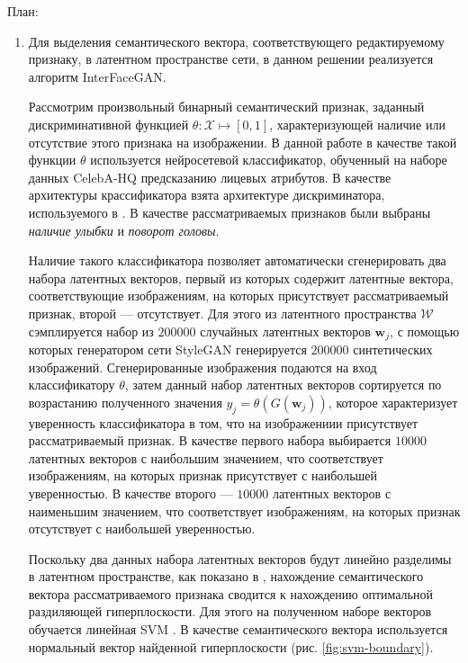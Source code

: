
План:
\begin{enumerate}

\item 
Для выделения семантического вектора, соответствующего редактируемому признаку, в латентном пространстве сети, в данном решении реализуется алгоритм InterFaceGAN.

Рассмотрим произвольный бинарный семантический признак, заданный дискриминативной функцией $\theta : \mathcal X \mapsto [0,1]$, характеризующей наличие или отсутствие этого признака на изображении. 
В данной работе в качестве такой функции $\theta$ используется нейросетевой классификатор, обученный на наборе данных CelebA-HQ \cite{liu2015celeba, progressive-growing-gan} предсказанию лицевых атрибутов.
В качестве архитектуры крассификатора взята архитектуре дискриминатора, используемого в \cite{progressive-growing-gan, StyleGAN}. 
В качестве рассматриваемых признаков были выбраны \emph{наличие улыбки} и \emph{поворот головы}.

Наличие такого классификатора позволяет автоматически сгенерировать два набора латентных векторов, первый из которых содержит латентные вектора, соответствующие изображениям, на которых присутствует рассматриваемый признак, второй --- отсутствует.
Для этого из латентного пространства $\mathcal W$ сэмплируется набор из $200000$ случайных латентных векторов $\mathbf w_j$, с помощью которых генератором сети StyleGAN генерируется $200000$ синтетических изображений.
Сгенерированные изображения подаются на вход классификатору $\theta$, затем данный набор латентных векторов сортируется по возрастанию полученного значения $ y_j = \theta(G(\mathbf w_j))$, которое характеризует уверенность классификатора в том, что на изображениии присутствует рассматриваемый признак.
В качестве первого набора выбирается $10000$ латентных векторов с наибольшим значением, что соответствует изображениям, на которых признак присутствует с наибольшей уверенностью.
В качестве второго --- $10000$ латентных векторов с наименьшим значением, что соответствует изображениям, на которых признак отсутствует с наибольшей уверенностью.

Поскольку два данных набора латентных векторов будут линейно разделимы в латентном пространстве, как показано в \cite{StyleGAN}, нахождение семантического вектора рассматриваемого признака сводится к нахождению оптимальной раздиляющей гиперплоскости. 
Для этого на полученном наборе векторов обучается линейная SVM \cite{svm}.
В качестве семантического вектора используется нормальный вектор найденной гиперплоскости (рис. \ref{fig:svm-boundary}).


\end{enumerate}
